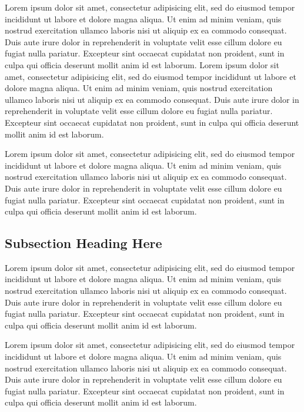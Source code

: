\documentclass{article}
\begin{document}
Lorem ipsum dolor sit amet, consectetur adipisicing elit, sed do eiusmod tempor
incididunt ut labore et dolore magna aliqua. Ut enim ad minim veniam, quis
nostrud exercitation ullamco laboris nisi ut aliquip ex ea commodo consequat.
Duis aute irure dolor in reprehenderit in voluptate velit esse cillum dolore eu
fugiat nulla pariatur. Excepteur sint occaecat cupidatat non proident, sunt in
culpa qui officia deserunt mollit anim id est laborum. Lorem ipsum dolor sit
amet, consectetur adipisicing elit, sed do eiusmod tempor incididunt ut labore
et dolore magna aliqua. Ut enim ad minim veniam, quis nostrud exercitation
ullamco laboris nisi ut aliquip ex ea commodo consequat. Duis aute irure dolor
in reprehenderit in voluptate velit esse cillum dolore eu fugiat nulla
pariatur. Excepteur sint occaecat cupidatat non proident, sunt in culpa qui
officia deserunt mollit anim id est laborum.

Lorem ipsum dolor sit amet, consectetur adipisicing elit, sed do eiusmod tempor
incididunt ut labore et dolore magna aliqua. Ut enim ad minim veniam, quis
nostrud exercitation ullamco laboris nisi ut aliquip ex ea commodo consequat.
Duis aute irure dolor in reprehenderit in voluptate velit esse cillum dolore eu
fugiat nulla pariatur. Excepteur sint occaecat cupidatat non proident, sunt in
culpa qui officia deserunt mollit anim id est laborum.


\subsection{Subsection Heading Here}

Lorem ipsum dolor sit amet, consectetur adipisicing elit, sed do eiusmod tempor
incididunt ut labore et dolore magna aliqua. Ut enim ad minim veniam, quis
nostrud exercitation ullamco laboris nisi ut aliquip ex ea commodo consequat.
Duis aute irure dolor in reprehenderit in voluptate velit esse cillum dolore eu
fugiat nulla pariatur. Excepteur sint occaecat cupidatat non proident, sunt in
culpa qui officia deserunt mollit anim id est laborum.

Lorem ipsum dolor sit amet, consectetur adipisicing elit, sed do eiusmod tempor
incididunt ut labore et dolore magna aliqua. Ut enim ad minim veniam, quis
nostrud exercitation ullamco laboris nisi ut aliquip ex ea commodo consequat.
Duis aute irure dolor in reprehenderit in voluptate velit esse cillum dolore eu
fugiat nulla pariatur. Excepteur sint occaecat cupidatat non proident, sunt in
culpa qui officia deserunt mollit anim id est laborum.
\end{document}
